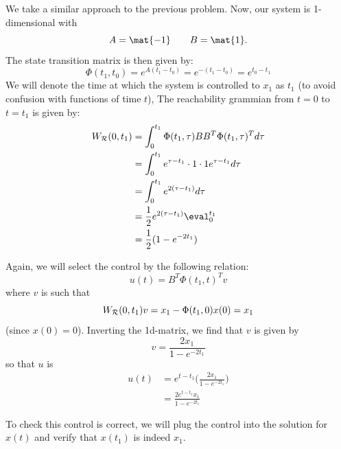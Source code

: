 \documentclass{homework}
\begin{document}
\begin{letterenum}
\item
We take a similar approach to the previous problem. Now, our system
is 1-dimensional with
\begin{equation*}
    A = \mat{-1} \qquad B = \mat{1}.
\end{equation*}
The state transition matrix is then given by:
\begin{equation*}
    \Phi(t_1, t_0) = e^{A(t_1 - t_0)} = e^{-(t_1 - t_0)} = e^{t_0 - t_1}
\end{equation*}
We will denote the time at which the system is controlled to $x_1$ as
$t_1$ (to avoid confusion with functions of time $t$), The reachability
grammian from $t=0$ to $t=t_1$ is given by:
\begin{align*}
    W_\reach(0, t_1) &= \int_{0}^{t_1}
            \Phi(t_1, \tau) B B^T \Phi(t_1, \tau)^T d\tau \\
        &= \int_{0}^{t_1} e^{\tau - t_1} \cdot 1 \cdot 1 e^{\tau - t_1} d\tau \\
        &= \int_{0}^{t_1} e^{2(\tau - t_1)} d\tau \\
        &= \frac{1}{2} e^{2(\tau - t_1)} \eval_0^{t_1} \\
        &= \frac{1}{2} (1 - e^{-2 t_1}) \\
\end{align*}

Again, we will select the control by the following relation:
\begin{equation*}
    u(t) = B^T \Phi(t_1, t)^T v
\end{equation*}
where $v$ is such that
\begin{equation*}
    W_{\mathcal{R}}(0, t_1) v = x_1 - \Phi(t_1, 0) x(0) = x_1
\end{equation*}
(since $x(0) = 0$). Inverting the 1d-matrix, we find that $v$ is given by
\begin{equation*}
    v = \frac{2x_1}{1 - e^{-2t_1}}
\end{equation*}
so that $u$ is
\begin{align}
    u(t) &= e^{t - t_1} \biggl(\frac{2x_1}{1 - e^{-2t_1}}\biggr) \\
        &= \frac{2e^{t- t_1} x_1}{1 - e^{-2t_1}}
        \label{eq:best-control}
\end{align}

To check this control is correct, we will plug the control into 
the solution for $x(t)$ and verify that $x(t_1)$ is indeed $x_1$.


\end{letterenum}
\end{document}
